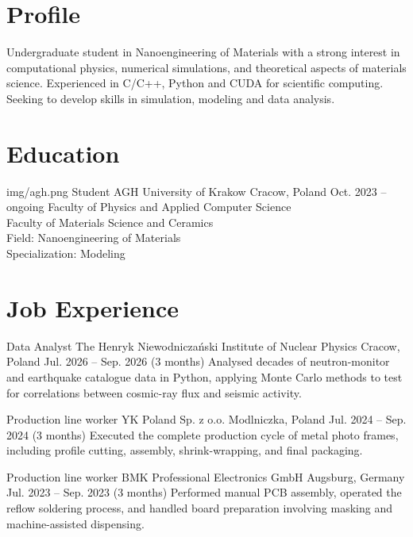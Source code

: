 \documentclass[final,a4paper,10pt,onecolumn]{article}
\begin{document}
\begin{cvmain}

\section{Profile}

Undergraduate student in Nanoengineering of Materials with a strong interest in computational physics, numerical simulations, and theoretical aspects of materials science.
Experienced in C/C++, Python and CUDA for scientific computing. 
Seeking to develop skills in simulation, modeling and data analysis.

\section{Education}

\eduentry
    {img/agh.png}
    {Student}
    {AGH University of Krakow}
    {Cracow, Poland}
    {Oct. 2023 -- ongoing}
    {Faculty of Physics and Applied Computer Science\\
    Faculty of Materials Science and Ceramics\\
    Field: Nanoengineering of Materials\\
    Specialization: Modeling}

\section{Job Experience}

\jobentry
    {Data Analyst}
    {The Henryk Niewodniczański Institute of Nuclear Physics}
    {Cracow, Poland}
    {Jul. 2026 -- Sep. 2026 (3 months)}
    {Analysed decades of neutron-monitor and earthquake catalogue data in Python, applying Monte Carlo methods to test for correlations between cosmic-ray flux and seismic activity.}

\jobentry
    {Production line worker}
    {YK Poland Sp. z o.o.}
    {Modlniczka, Poland}
    {Jul. 2024 -- Sep. 2024 (3 months)}
    {Executed the complete production cycle of metal photo frames, including profile cutting, assembly, shrink-wrapping, and final packaging.}

\jobentry
    {Production line worker}
    {BMK Professional Electronics GmbH}
    {Augsburg, Germany}
    {Jul. 2023 -- Sep. 2023 (3 months)}
    {Performed manual PCB assembly, operated the reflow soldering process, and handled board preparation involving masking and machine-assisted dispensing.}


\end{cvmain}
\end{document}
